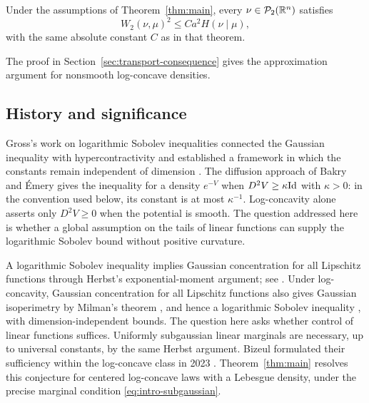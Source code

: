 \begin{corollary}
\label{cor:intro-transport}
Under the assumptions of Theorem~\ref{thm:main}, every
$\nu\in\mathcal P_2(\mathbb R^n)$ satisfies
\[
 W_2(\nu,\mu)^2\le Ca^2 H(\nu\mid\mu),
\]
with the same absolute constant $C$ as in that theorem.
\end{corollary}

The proof in Section~\ref{sec:transport-consequence} gives the
approximation argument for nonsmooth log-concave densities.

\subsection{History and significance}

Gross's work on logarithmic Sobolev inequalities connected the
Gaussian inequality with hypercontractivity and established a
framework in which the constants remain independent of dimension
\cite{Gross1975}.  The diffusion approach of Bakry and \'Emery
\cite{BakryEmery1985} gives the inequality for a density $e^{-V}$
when $D^2V\ge\kappa\mathrm{Id}$ with $\kappa>0$: in the convention used
below, its constant is at most $\kappa^{-1}$.
Log-concavity alone asserts only $D^2V\ge0$ when the potential is
smooth.  The question addressed here is whether a global assumption
on the tails of linear functions can supply the logarithmic Sobolev
bound without positive curvature.

A logarithmic Sobolev inequality implies Gaussian concentration for
all Lipschitz functions through Herbst's exponential-moment argument;
see \cite[Section~2.3]{Ledoux1999}.  Under log-concavity, Gaussian
concentration for all Lipschitz functions also gives Gaussian
isoperimetry by Milman's theorem \cite[Theorem~1.1]{Milman2010},
and hence a logarithmic Sobolev inequality
\cite[Lemma~3.3]{Bobkov1999}, with dimension-independent bounds.
The question here asks whether control of linear functions suffices.
Uniformly subgaussian linear marginals are necessary, up to universal
constants, by the same Herbst argument.
Bizeul formulated their sufficiency within the log-concave class in 2023
\cite[Conjecture~2]{Bizeul2026}.  Theorem~\ref{thm:main} resolves
this conjecture for centered log-concave laws with a Lebesgue density,
under the precise marginal condition
\eqref{eq:intro-subgaussian}.

